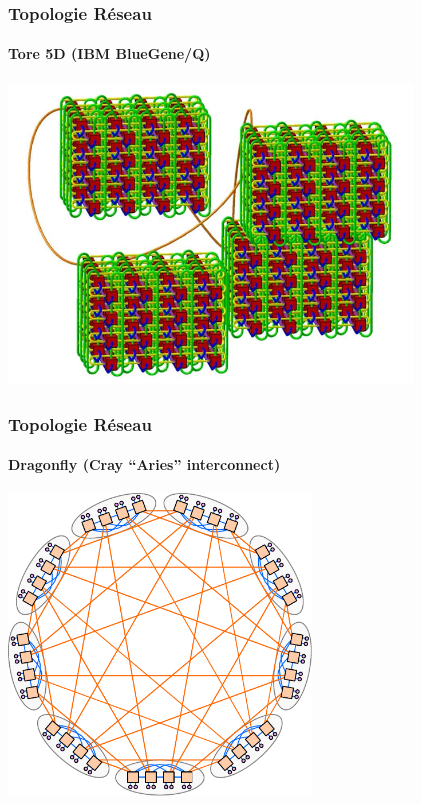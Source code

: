 \documentclass[xcolor={x11names,svgnames,psnames}]{beamer}
\begin{document}
\begin{frame}
  \frametitle{Topologie Réseau}
  \framesubtitle{Tore 5D (IBM BlueGene/Q)}

  \centering
  \includegraphics[height=8cm]{5D_torus.pdf}
\end{frame}

\begin{frame}
  \frametitle{Topologie Réseau}
  \framesubtitle{Dragonfly (Cray ``Aries'' interconnect)}

  \centering
  \includegraphics[height=8cm]{dragonfly.pdf}
\end{frame}
\fi


\end{document}
